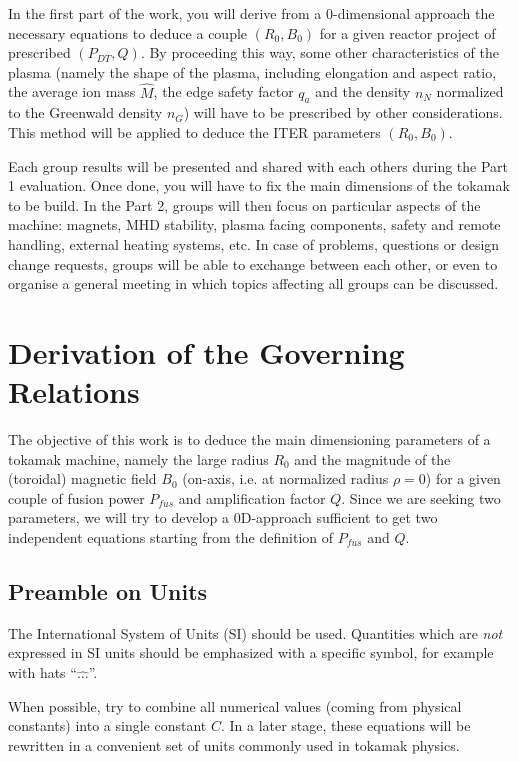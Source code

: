 In the first part of the work, you will derive from a 0-dimensional approach the necessary equations to deduce a couple $(R_0, B_0)$ for a given reactor project of prescribed $(P_{DT}, Q)$. By proceeding this way, some other characteristics of the plasma (namely the shape of the plasma, including elongation and aspect ratio, the average ion mass $\hat M$, the edge safety factor $q_a$ and the density $n_N$ normalized to the Greenwald density $n_G$) will have to be prescribed by other considerations. This method will be applied to deduce the ITER parameters $(R_0, B_0)$. 

Each group results will be presented and shared with each others during the Part 1 evaluation. Once done, you will have to fix the main dimensions of the tokamak to be build. In the Part 2, groups will then focus on particular aspects of the machine: magnets, MHD stability, plasma facing components, safety and remote handling, external heating systems, etc. In case of problems, questions or design change requests, groups will be able to exchange between each other, or even to organise a general meeting in which topics affecting all groups can be discussed.


\section{Derivation of the Governing Relations}
The objective of this work is to deduce the main dimensioning parameters of a tokamak machine, namely the large radius $R_0$ and the magnitude of the (toroidal) magnetic field $B_0$ (on-axis, i.e. at normalized radius $\rho=0$) for a given couple of fusion power $P_{fus}$ and amplification factor $Q$. Since we are seeking two parameters, we will try to develop a 0D-approach sufficient to get two independent equations starting from the definition of $P_{fus}$ and $Q$. 

\subsection{Preamble on Units}
The International System of Units (SI) should be used. Quantities which are \emph{not} expressed in SI units should be emphasized with a specific symbol, for example with hats ``$\hat{...}$''.

When possible, try to combine all numerical values (coming from physical constants) into a single constant $C$. In a later stage, these equations will be rewritten in a convenient set of units commonly used in tokamak physics.



